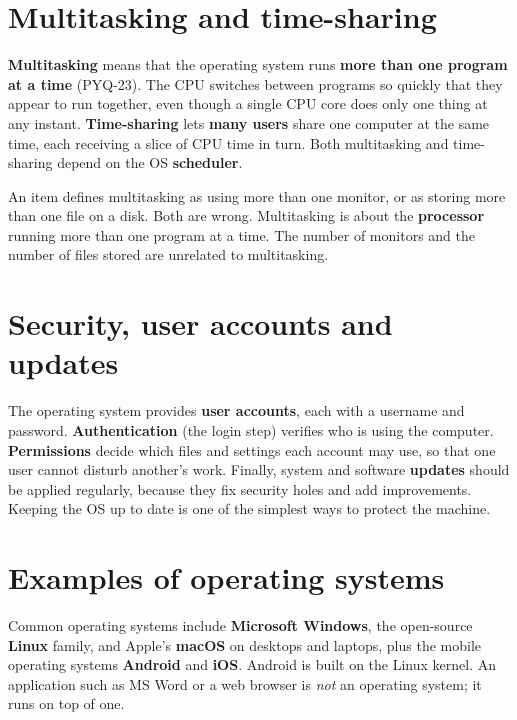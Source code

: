 \section{Multitasking and time-sharing}
\textbf{Multitasking} means that the operating system runs \textbf{more than
one program at a time} (PYQ-23). The CPU switches between programs so quickly
that they appear to run together, even though a single CPU core does only one
thing at any instant. \textbf{Time-sharing} lets \textbf{many users} share one
computer at the same time, each receiving a slice of CPU time in turn. Both
multitasking and time-sharing depend on the OS \textbf{scheduler}.

\begin{example}
An item defines multitasking as using more than one monitor, or as storing more
than one file on a disk. Both are wrong. Multitasking is about the
\textbf{processor} running more than one program at a time. The number of
monitors and the number of files stored are unrelated to multitasking.
\end{example}

\section{Security, user accounts and updates}
The operating system provides \textbf{user accounts}, each with a username and
password. \textbf{Authentication} (the login step) verifies who is using the
computer. \textbf{Permissions} decide which files and settings each account may
use, so that one user cannot disturb another's work. Finally, system and
software \textbf{updates} should be applied regularly, because they fix
security holes and add improvements. Keeping the OS up to date is one of the
simplest ways to protect the machine.

\section{Examples of operating systems}
Common operating systems include \textbf{Microsoft Windows}, the open-source
\textbf{Linux} family, and Apple's \textbf{macOS} on desktops and laptops, plus
the mobile operating systems \textbf{Android} and \textbf{iOS}. Android is
built on the Linux kernel. An application such as MS Word or a web browser is
\emph{not} an operating system; it runs on top of one.

